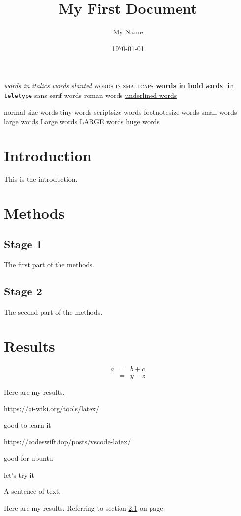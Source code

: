 \documentclass[a4paper,12pt]{article}
\begin{document}
\title{My First Document}
\author{My Name}
\date{\today}
\maketitle

\tableofcontents
\newpage
{}


\textit{words in italics}
\textsl{words slanted}
\textsc{words in smallcaps}
\textbf{words in bold}
\texttt{words in teletype}
\textsf{sans serif words}
\textrm{roman words}
\underline{underlined words}

normal size words
{\tiny tiny words}
{\scriptsize scriptsize words}
{\footnotesize footnotesize words}
{\small small words}
{\large large words}
{\Large Large words}
{\LARGE LARGE words}
{\huge huge words}

\section{Introduction}
This is the introduction.

\section{Methods}

\subsection{Stage 1}
\label{sec1}
The first part of the methods.

\subsection{Stage 2}
The second part of the methods.

\section{Results}

\begin{eqnarray}
    a & = & b + c \\
      & = & y - z
    \end{eqnarray}


Here are my results.

https://oi-wiki.org/tools/latex/

good to learn it

https://codeswift.top/posts/vscode-latex/

good for ubuntu

let's try it

A sentence of text.

Here are my results. Referring to section \ref{sec1} on page \pageref{sec1}
\end{document}
